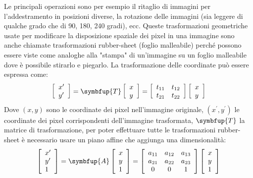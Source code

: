 Le principali operazioni sono per esempio  il ritaglio di immagini
per l'addestramento in posizioni diverse, la rotazione delle immagini (sia leggere di qualche grado che di 90, 180, 240 gradi), ecc. Queste trasformazioni geometriche usate per modificare la disposizione spaziale dei pixel in una 
immagine sono anche chiamate trasformazioni rubber-sheet (foglio malleabile) perché 
possono essere viste come analoghe alla "stampa" di un'immagine su un foglio malleabile dove è possibile stirarlo e piegarlo. La trasformazione delle coordinate può essere espressa come:
\[ \left[\begin{array}{l}x^{\prime} \\ y^{\prime}\end{array}\right]=\symbfup{T}\left[\begin{array}{l}x \\ y\end{array}\right]=\left[\begin{array}{ll}t_{11} & t_{12} \\ t_{21} & t_{22}\end{array}\right]\left[\begin{array}{l}x \\ y\end{array}\right] \]
Dove \((x,y)\)  sono le coordinate dei pixel nell'immagine originale, \((x^{\prime},y^{\prime})\)  le 
coordinate dei pixel corrispondenti dell'immagine trasformata, \(\symbfup{T}\) la matrice di trasformazione, per poter effettuare tutte le trasformazioni rubber-sheet è necessario usare un piano affine che aggiunga una dimensionalità:
\[ \left[\begin{array}{l}x^{\prime} \\ y^{\prime} \\ 1\end{array}\right]=\symbfup{A}\left[\begin{array}{l}x \\ y \\ 1\end{array}\right]=\left[\begin{array}{ccc}a_{11} & a_{12} & a_{13} \\ a_{21} & a_{22} & a_{23} \\ 0 & 0 & 1\end{array}\right]\left[\begin{array}{l}x \\ y \\ 1\end{array}\right] \]

